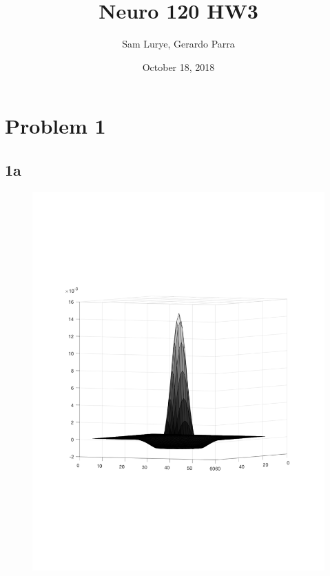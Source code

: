 \documentclass[]{article}
\begin{document}
\title{Neuro 120 HW3}
\author{Sam Lurye, Gerardo Parra}
\date{October 18, 2018}
\maketitle

\section*{Problem 1}
\subsection*{1a}
\begin{figure}[H]
    \centering
    \includegraphics[width=0.7\linewidth]{problem1A.pdf}
    \label{fig:my_label}
\end{figure}
\end{document}

